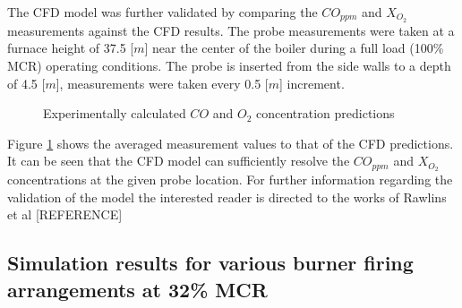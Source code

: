 \documentclass[review]{elsarticle}
\begin{document}
The CFD model was further validated by comparing the $CO_{ppm}$ and $X_{O_{2}}$ measurements against the CFD results. The probe measurements were taken at a furnace height of 37.5 [$m$] near the center of the boiler during a full load (100\% MCR) operating conditions. The probe is inserted from the side walls to a depth of 4.5 [$m$], measurements were taken every 0.5 [$m$] increment.\\
\begin{figure}[h!]
\centering
{}
\hspace{5mm}
\caption{Experimentally calculated $CO$ and $O_2$ concentration predictions}
\label{fig_probe_valid}
\end{figure}

Figure \ref{fig_probe_valid} shows the averaged measurement values to that of the CFD predictions. It can be seen that the CFD model can sufficiently resolve the $CO_{ppm}$ and $X_{O_{2}}$ concentrations at the given probe location. For further information regarding the validation of the model the interested reader is directed to the works of Rawlins et al [REFERENCE]

\subsection{Simulation results for various burner firing arrangements at 32\% MCR }
\end{document}

